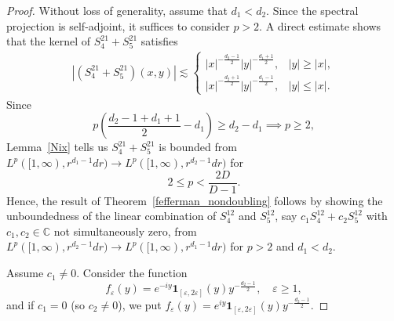 \documentclass[10pt,a4paper]{amsart}
\begin{document}
\begin{proof}
Without loss of generality, assume that \(d_1<d_2\).
Since the spectral projection is self-adjoint, it  suffices to
consider $p>2$.  A direct estimate shows  that the kernel of $S_4^{21}+S_{5}^{21}$
satisfies 
\begin{align*}
    |(S_4^{21}+S_{5}^{21})(x,y)| \lesssim \begin{cases}
        |x|^{-\frac{d_2-1}{2}} |y|^{-\frac{d_1+1}{2}}, & |y|\ge |x|,\\
        |x|^{-\frac{d_2+1}{2}} |y|^{-\frac{d_1-1}{2}}, & |y|\le |x|.
    \end{cases}
\end{align*}
Since 
\begin{equation*}
    p\left( \frac{d_2-1+d_1+1}{2} - d_1 \right) \ge d_2-d_1 \implies p\ge 2,
\end{equation*}
Lemma~\ref{Nix} tells us $S_4^{21}+S_{5}^{21}$ is bounded from $L^p([1,\infty), r^{d_1-1}dr) \to L^p([1,\infty), r^{d_2-1}dr)$ for 
\begin{equation*}
    2\le  p < \frac{2D}{D-1}.
\end{equation*}
Hence, the result of Theorem~\ref{fefferman_nondoubling} follows by showing the unboundedness of the linear combination of $S_4^{12}$ and $S_{5}^{12}$, say $c_1 S_4^{12} + c_2 S_5^{12}$ with $c_1,c_2 \in \mathbb C$ not simultaneously zero, from $L^p([1,\infty), r^{d_2-1}dr) \to L^p([1,\infty), r^{d_1-1}dr)$ for $p>2$ and $d_1<d_2$. 

Assume $c_1\ne 0$. Consider the function 
\begin{equation}\label{couterF}
    f_\varepsilon(y) = e^{-iy} \mathbf{1}_{[\varepsilon,2\varepsilon]}(y) y^{-\frac{d_2-1}{2}}, \quad \varepsilon\ge 1,
\end{equation}
and if $c_1=0$ (so $c_2\ne 0$), we put $f_\varepsilon(y) = e^{iy} \mathbf{1}_{[\varepsilon,2\varepsilon]}(y) y^{-\frac{d_2-1}{2}}$.


\end{proof}
\end{document}
